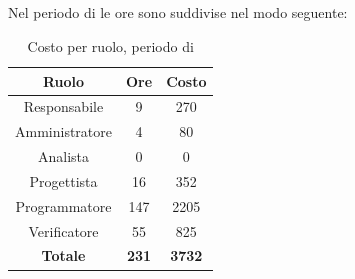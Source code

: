 \subsection{\Cod}
Nel periodo di \Cod{} le ore sono suddivise nel modo seguente:
\begin{table}[H]
	\centering
	\begin{tabular}{|c|c|c|}
		\hline
		\textbf{Ruolo} &
		\textbf{Ore} &
		\textbf{Costo} \\
		\hline
		Responsabile & 9 & 270 \\
		\hline
		Amministratore & 4 & 80 \\
		\hline
		Analista & 0 & 0\\
		\hline
		Progettista & 16 & 352 \\
		\hline
		Programmatore & 147 & 2205 \\
		\hline
		Verificatore & 55 & 825 \\
		\hline
		\textbf{Totale} & \textbf{231} & \textbf{3732} \\
		\hline
	\end{tabular}
	\caption{Costo per ruolo, periodo di \Cod}
\end{table}


